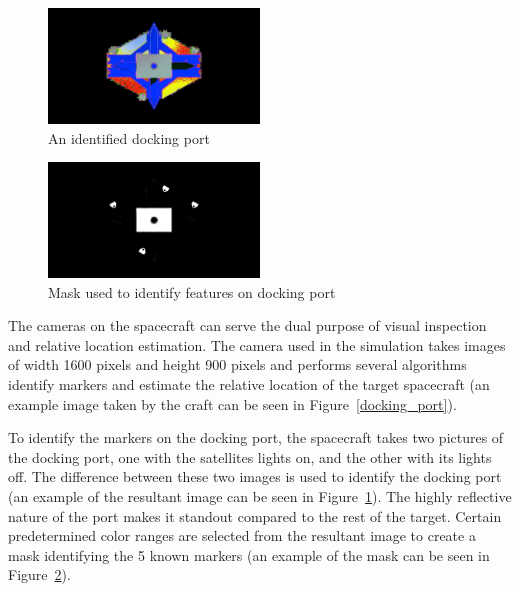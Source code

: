 \documentclass[journal, 10pt]{IEEEtran}
\begin{document}
\begin{figure}[tbh]
\begin{center}
\includegraphics[width=0.5\textwidth]{figures/DockingPortSubtraction.pdf}
\caption{An identified docking port}
\label{docking_port_subtraction}
\end{center}
\end{figure}

\begin{figure}[tbh]
\begin{center}
\includegraphics[width=0.5\textwidth]{figures/DockingPortFeatures.pdf}
\caption{Mask used to identify features on docking port}
\label{docking_port_features}
\end{center}
\end{figure}

The cameras on the spacecraft can serve the dual purpose of visual inspection and relative location estimation. The camera used in the simulation takes images of width 1600 pixels and height 900 pixels and performs several algorithms identify markers and estimate the relative location of the target spacecraft (an example image taken by the craft can be seen in Figure~\ref{docking_port}).

To identify the markers on the docking port, the spacecraft takes two pictures of the docking port, one with the satellites lights on, and the other with its lights off. The difference between these two images is used to identify the docking port (an example of the resultant image can be seen in Figure~\ref{docking_port_subtraction}). The highly reflective nature of the port makes it standout compared to the rest of the target. Certain predetermined color ranges are selected from the resultant image to create a mask identifying the 5 known markers (an example of the mask can be seen in Figure~\ref{docking_port_features}).
\end{document}

